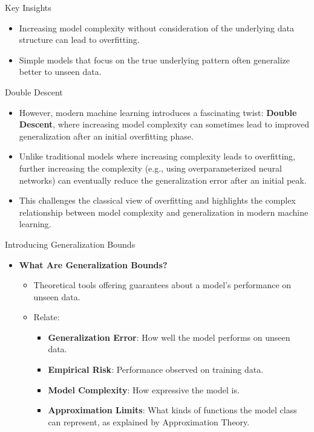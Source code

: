 \documentclass[
  ignorenonframetext,
]{beamer}
\providecommand{\tightlist}{%
  \setlength{\itemsep}{0pt}\setlength{\parskip}{0pt}}\usepackage{longtable,booktabs,array}
\begin{document}
\begin{frame}
\begin{block}{Key Insights}
\label{key-insights}
\begin{itemize}
\tightlist
\item
  Increasing model complexity without consideration of the underlying
  data structure can lead to overfitting.
\item
  Simple models that focus on the true underlying pattern often
  generalize better to unseen data.
\end{itemize}
\end{block}
\end{frame}

\begin{frame}{Double Descent}
\label{double-descent}
\begin{itemize}
\tightlist
\item
  However, modern machine learning introduces a fascinating twist:
  \textbf{Double Descent}, where increasing model complexity can
  sometimes lead to improved generalization after an initial overfitting
  phase.
\item
  Unlike traditional models where increasing complexity leads to
  overfitting, further increasing the complexity (e.g., using
  overparameterized neural networks) can eventually reduce the
  generalization error after an initial peak.
\item
  This challenges the classical view of overfitting and highlights the
  complex relationship between model complexity and generalization in
  modern machine learning.
\end{itemize}
\end{frame}

\begin{frame}{Introducing Generalization Bounds}
\label{introducing-generalization-bounds}
\begin{itemize}
\tightlist
\item
  \textbf{What Are Generalization Bounds?}

  \begin{itemize}
  \tightlist
  \item
    Theoretical tools offering guarantees about a model's performance on
    unseen data.
  \item
    Relate:

    \begin{itemize}
    \tightlist
    \item
      \textbf{Generalization Error}: How well the model performs on
      unseen data.
    \item
      \textbf{Empirical Risk}: Performance observed on training data.
    \item
      \textbf{Model Complexity}: How expressive the model is.
    \item
      \textbf{Approximation Limits}: What kinds of functions the model
      class can represent, as explained by Approximation Theory.
    \end{itemize}
  \end{itemize}
\end{itemize}
\end{frame}
\end{document}
